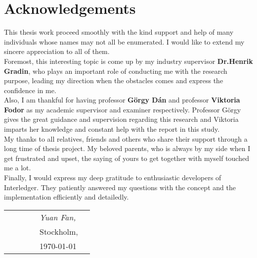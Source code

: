 \section*{Acknowledgements}

This thesis work proceed smoothly with the kind support and help of many individuals whose names may not all be enumerated. I would like to extend my sincere appreciation to all of them.\\

\noindent Foremost, this interesting topic is come up by my industry supervisor \textbf{Dr.Henrik Gradin}, who plays an important role of conducting me with the research purpose, leading my direction when the obstacles comes and express the confidence in me.\\

\noindent Also, I am thankful for having professor \textbf{G\"{o}rgy D\'{a}n} and professor \textbf{Viktoria Fodor} as my academic supervisor and examiner respectively. Professor G\"{o}rgy gives the great guidance and supervision regarding this research and Viktoria imparts her knowledge and constant help with the report in this study.\\


\noindent My thanks to all relatives, friends and others who share their support through a long time of thesis project. My beloved parents, who is always by my side when I get frustrated and upset, the saying of yours to get together with myself touched me a lot.\\

\noindent
Finally, I would express my deep gratitude to enthusiastic developers of Interledger. They patiently answered my questions with the concept and the implementation efficiently and detailedly.
\begin{table}[hb]
\begin{tabular}{lp{6.67cm}llll}
& & & & \textit{Yuan Fan,} \\
& & & & Stockholm, \\
& & & & \today
\end{tabular}
\end{table}



